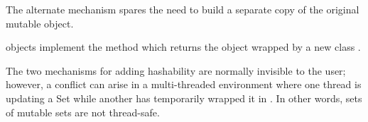 The alternate mechanism spares the need to build a separate copy of
the original mutable object.

 objects implement the  method
which returns the  object wrapped by a new class
.

The two mechanisms for adding hashability are normally invisible to the
user; however, a conflict can arise in a multi-threaded environment
where one thread is updating a Set while another has temporarily wrapped it
in .  In other words, sets of mutable sets
are not thread-safe.







